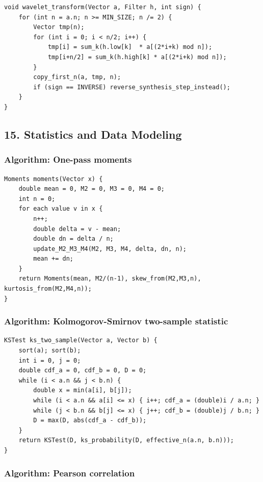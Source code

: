 \documentclass[11pt]{article}
\begin{document}
\begin{verbatim}
void wavelet_transform(Vector a, Filter h, int sign) {
    for (int n = a.n; n >= MIN_SIZE; n /= 2) {
        Vector tmp(n);
        for (int i = 0; i < n/2; i++) {
            tmp[i] = sum_k(h.low[k]  * a[(2*i+k) mod n]);
            tmp[i+n/2] = sum_k(h.high[k] * a[(2*i+k) mod n]);
        }
        copy_first_n(a, tmp, n);
        if (sign == INVERSE) reverse_synthesis_step_instead();
    }
}
\end{verbatim}

\subsection{15. Statistics and Data Modeling}\label{statistics-and-data-modeling}

\subsubsection{Algorithm: One-pass moments}\label{algorithm-one-pass-moments}

\begin{verbatim}
Moments moments(Vector x) {
    double mean = 0, M2 = 0, M3 = 0, M4 = 0;
    int n = 0;
    for each value v in x {
        n++;
        double delta = v - mean;
        double dn = delta / n;
        update_M2_M3_M4(M2, M3, M4, delta, dn, n);
        mean += dn;
    }
    return Moments(mean, M2/(n-1), skew_from(M2,M3,n), kurtosis_from(M2,M4,n));
}
\end{verbatim}

\subsubsection{Algorithm: Kolmogorov-Smirnov two-sample statistic}\label{algorithm-kolmogorov-smirnov-two-sample-statistic}

\begin{verbatim}
KSTest ks_two_sample(Vector a, Vector b) {
    sort(a); sort(b);
    int i = 0, j = 0;
    double cdf_a = 0, cdf_b = 0, D = 0;
    while (i < a.n && j < b.n) {
        double x = min(a[i], b[j]);
        while (i < a.n && a[i] <= x) { i++; cdf_a = (double)i / a.n; }
        while (j < b.n && b[j] <= x) { j++; cdf_b = (double)j / b.n; }
        D = max(D, abs(cdf_a - cdf_b));
    }
    return KSTest(D, ks_probability(D, effective_n(a.n, b.n)));
}
\end{verbatim}

\subsubsection{Algorithm: Pearson correlation}\label{algorithm-pearson-correlation}
\end{document}
